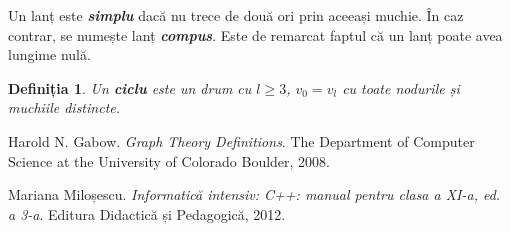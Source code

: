 \documentclass[9pt,a4paper]{report}
\newtheorem{definitie}{Definiția}
\begin{document}
Un lanț este \textbf{\textit{simplu}} dacă nu trece de două ori prin aceeași muchie. În caz contrar, se numește lanț \textbf{\textit{compus}}. Este de remarcat faptul că un lanț poate avea lungime nulă.

\begin{definitie}
    Un \textbf{ciclu} este un drum cu $l \geq 3$, $v_0 = v_l$ cu toate nodurile și muchiile distincte.
\end{definitie}

\begin{thebibliography}{9}
    Harold N. Gabow. 
    \textit{Graph Theory Definitions}. 
    The Department of Computer Science at the University of Colorado Boulder, 2008.
    
    Mariana Miloșescu. 
    \textit{Informatică intensiv: C++: manual pentru clasa a XI-a, ed. a 3-a}.
    Editura Didactică și Pedagogică, 2012.
    
    \end{thebibliography}
\end{document}
